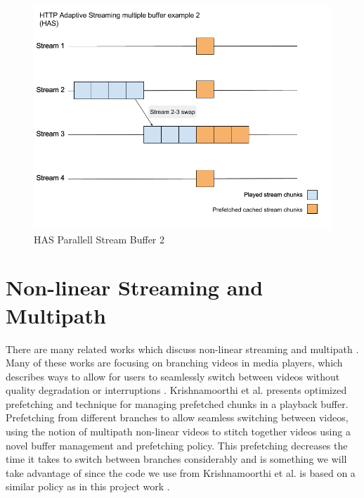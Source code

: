 \begin{figure}[!ht]
\begin{center}
\includegraphics[scale=0.4]{HAS2.png}
\caption{HAS Parallell Stream Buffer 2}
\label{fig:HAS2}
\end{center}
\end{figure}

\section{Non-linear Streaming and Multipath}
\label{sec:nonlinear}
There are many related works which discuss non-linear streaming and multipath \cite{qualbranch, hasmultipath,scalableOnDemand,optimizedbroadcast}. Many of these works are focusing on branching videos in media players, which describes ways to allow for users to seamlessly switch between videos without quality degradation or interruptions \cite{qualbranch, hasmultipath,scalableOnDemand}. Krishnamoorthi et al. \cite{hasmultipath} presents optimized prefetching and technique for managing prefetched chunks in a playback buffer. Prefetching from different branches to allow seamless switching between videos, using the notion of multipath non-linear videos to stitch together videos using a novel buffer management and prefetching policy. This prefetching decreases the time it takes to switch between branches considerably and is something we will take advantage of since the code we use from Krishnamoorthi et al.\cite{qualbranch} is based on a similar policy as in this project work \cite{hasmultipath}. 

